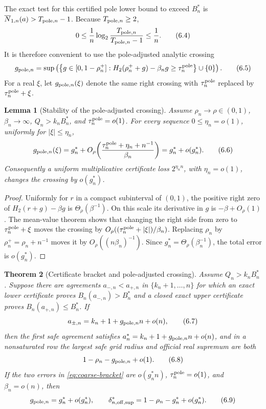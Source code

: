 \documentclass[a4paper,11pt]{amsart}
\newtheorem{theorem}{Theorem}[section]
\newtheorem{lemma}[theorem]{Lemma}
\theoremstyle{remark}
\newcommand{\barN}{\overline N}
\newcommand{\abs}[1]{\lvert#1\rvert}
\begin{document}
The exact test for this certified pole lower bound to exceed \(B_n^*\) is
\(\barN_{1,n}(a)>T_{{\rm pole},n}-1\).  Because
\(T_{{\rm pole},n}\ge2\),
\[
 0\le\frac1n\log_2\frac{T_{{\rm pole},n}}
 {T_{{\rm pole},n}-1}\le\frac1n.                 \tag{6.4}\label{eq:pole-ceiling-error}
\]
It is therefore convenient to use the pole-adjusted analytic crossing
\[
 g_{{\rm pole},n}=\sup\left(
 \left\{g\in[0,1-\rho_n^+]:
 H_2(\rho_n^++g)-\beta_ng\ge\tau_n^{\rm pole}\right\}\cup\{0\}
 \right).                                          \tag{6.5}\label{eq:pole-crossing}
\]
For a real \(\xi\), let \(g_{{\rm pole},n}(\xi)\) denote the same right
crossing with \(\tau_n^{\rm pole}\) replaced by
\(\tau_n^{\rm pole}+\xi\).

\begin{lemma}[Stability of the pole-adjusted crossing]\label{lem:crossing-stability}
Assume \(\rho_n\to\rho\in(0,1)\), \(\beta_n\to\infty\),
\(Q_n>k_nB_n^*\), and \(\tau_n^{\rm pole}=o(1)\).  For every sequence
\(0\le\eta_n=o(1)\), uniformly for \(\abs{\xi}\le\eta_n\),
\[
 g_{{\rm pole},n}(\xi)=g_n^*
 +O_\rho\!\left(\frac{\tau_n^{\rm pole}+\eta_n+n^{-1}}{\beta_n}\right)
 =g_n^*+o(g_n^*).                                  \tag{6.6}\label{eq:crossing-stability}
\]
Consequently a uniform multiplicative certificate loss \(2^{\eta_n n}\),
with \(\eta_n=o(1)\), changes the crossing by \(o(g_n^*)\).
\end{lemma}

\begin{proof}
Uniformly for \(r\) in a compact subinterval of \((0,1)\), the positive
right zero of \(H_2(r+g)-\beta g\) is
\(\Theta_\rho(\beta^{-1})\).  On this scale its derivative in \(g\) is
\(-\beta+O_\rho(1)\).  The mean-value theorem shows that changing the right
side from zero to \(\tau_n^{\rm pole}+\xi\) moves the crossing by
\(O_\rho((\tau_n^{\rm pole}+\abs\xi)/\beta_n)\).  Replacing \(\rho_n\) by
\(\rho_n^+=\rho_n+n^{-1}\) moves it by
\(O_\rho((n\beta_n)^{-1})\).  Since
\(g_n^*=\Theta_\rho(\beta_n^{-1})\), the total error is \(o(g_n^*)\).
\end{proof}

\begin{theorem}[Certificate bracket and pole-adjusted crossing]
\label{thm:target-crossing}
Assume \(Q_n>k_nB_n^*\).  Suppose there are agreements
\(a_{-,n}<a_{+,n}\) in \(\{k_n+1,\ldots,n\}\) for which an exact lower certificate proves
\(B_n(a_{-,n})>B_n^*\) and a closed exact upper certificate proves
\(B_n(a_{+,n})\le B_n^*\).  If
\[
 a_{\pm,n}=k_n+1+g_{{\rm pole},n}n+o(n),           \tag{6.7}\label{eq:coarse-bracket}
\]
then the first safe agreement satisfies
\(a_n^*=k_n+1+g_{{\rm pole},n}n+o(n)\), and in a nonsaturated row the
largest safe grid radius and official real supremum are both
\[
 1-\rho_n-g_{{\rm pole},n}+o(1).                  \tag{6.8}\label{eq:target-frontier}
\]
If the two errors in \eqref{eq:coarse-bracket} are \(o(g_n^*n)\),
\(\tau_n^{\rm pole}=o(1)\), and \(\beta_n=o(n)\), then
\[
 g_{{\rm pole},n}=g_n^*+o(g_n^*),\qquad
 \delta_{n,\mathrm{off,sup}}^*=1-\rho_n-g_n^*+o(g_n^*). \tag{6.9}\label{eq:sharp-frontier}
\]
\end{theorem}
\end{document}
